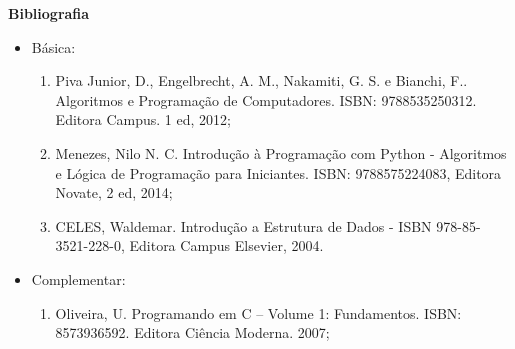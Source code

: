 
%
%
%


\begin{snugshade}\begin{center}\textbf{
    Bibliografia
}\end{center}\end{snugshade}

\begin{itemize} 
  \item Básica:
	\begin{enumerate}
		\item Piva Junior, D., Engelbrecht,  A. M., Nakamiti,  G. S. e Bianchi, F.. Algoritmos e Programação de Computadores. ISBN: 9788535250312. Editora Campus. 1 ed, 2012;
		\item Menezes, Nilo N. C. Introdução à Programação com Python - Algoritmos e Lógica de Programação para Iniciantes. ISBN: 9788575224083, Editora Novate, 2 ed, 2014;
		\item CELES, Waldemar. Introdução a Estrutura de Dados -  ISBN 978-85-3521-228-0, Editora Campus Elsevier, 2004.
	\end{enumerate}
  \item Complementar:
	\begin{enumerate} 
		\item Oliveira, U. Programando em C – Volume 1: Fundamentos. ISBN: 8573936592. Editora Ciência Moderna. 2007;
	\end{enumerate}
\end{itemize}
